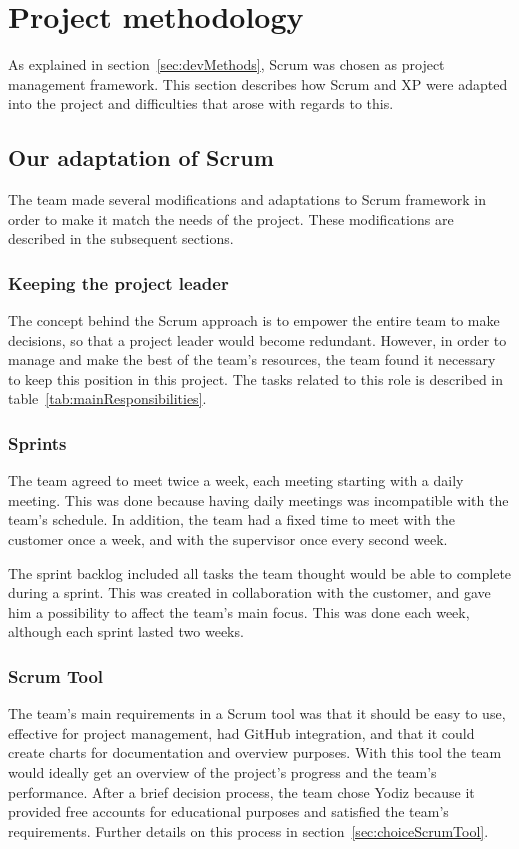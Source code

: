 \newpage
\section{Project methodology}
\label{sec:scrumDevProcess}

As explained in section~\ref{sec:devMethods}, Scrum was chosen as project management framework. 
This section describes how Scrum and XP were adapted into the project and difficulties that arose with regards to this.

\subsection{Our adaptation of Scrum}
The team made several modifications and adaptations to Scrum framework in order to make it match the needs of the project. These modifications are described in the subsequent sections.

\subsubsection{Keeping the project leader}
The concept behind the Scrum approach is to empower the entire team to make decisions, so that a project leader would become redundant. However, in order to manage and make the best of the team's resources, the team found it necessary to keep this position in this project. The tasks related to this role is described in table~\ref{tab:mainResponsibilities}.

\subsubsection{Sprints}
The team agreed to meet twice a week, each meeting starting with a daily meeting. This was done because having daily meetings was incompatible with the team's schedule. In addition, the team had a fixed time to meet with the customer once a week, and with the supervisor once every second week.

The sprint backlog included all tasks the team thought would be able to complete during a sprint. This was created in collaboration with the customer, and gave him a possibility to affect the team's main focus. This was done each week, although each sprint lasted two weeks.

\subsubsection{Scrum Tool}
\label{sec:scrumtool}
The team's main requirements in a Scrum tool was that it should be easy to use, effective for project management, had GitHub integration, and that it could create charts for documentation and overview purposes. With this tool the team would ideally get an overview of the project's progress and the team's performance. After a brief decision process, the team chose Yodiz because it provided free accounts for educational purposes and satisfied the team's requirements. Further details on this process in section~\ref{sec:choiceScrumTool}.

